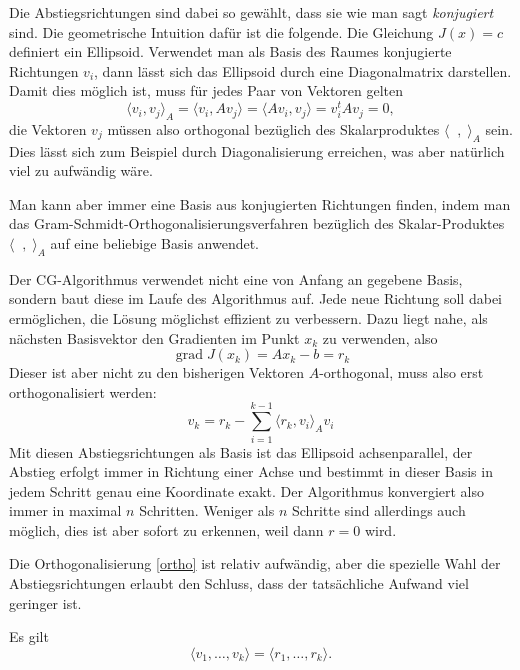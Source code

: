 \documentclass[a4paper,11pt]{article}
\begin{document}
Die Abstiegsrichtungen sind dabei so gewählt, dass sie wie man sagt
{\em konjugiert} sind.
Die geometrische Intuition dafür ist die folgende.
Die Gleichung $J(x)=c$ definiert ein Ellipsoid.
Verwendet man als Basis des Raumes konjugierte Richtungen $v_i$, dann lässt
sich das Ellipsoid durch eine Diagonalmatrix darstellen.
Damit dies möglich ist, muss für jedes Paar von Vektoren gelten
\[
\langle v_i , v_j\rangle_A
=
\langle v_i,Av_j\rangle
=
\langle Av_i,v_j\rangle
=
v_i^t Av_j = 0,
\]
die Vektoren $v_j$ müssen also orthogonal bezüglich des Skalarproduktes
$\langle\;\;,\;\rangle_A$ sein.
Dies lässt sich zum Beispiel durch Diagonalisierung erreichen, was
aber natürlich viel zu aufwändig wäre.

Man kann aber immer eine Basis aus konjugierten Richtungen finden,
indem man das Gram-Schmidt-Orthogonalisierungsverfahren bezüglich
des Skalar-Produktes $\langle\;\;,\;\rangle_A$ auf eine beliebige
Basis anwendet.

Der CG-Algorithmus verwendet nicht eine von Anfang an gegebene Basis,
sondern baut diese im Laufe des Algorithmus auf.
Jede neue Richtung soll dabei ermöglichen, die Lösung möglichst effizient
zu verbessern.
Dazu liegt nahe, als nächsten Basisvektor den Gradienten im Punkt
$x_k$ zu verwenden, also 
\[
\operatorname{grad}J(x_k) = Ax_k-b = r_k
\]
Dieser ist aber nicht zu den bisherigen Vektoren $A$-orthogonal,
muss also erst orthogonalisiert werden:
\begin{equation}
v_{k} = r_k - \sum_{i=1}^{k-1} \langle r_k,v_i\rangle_A v_i
\label{ortho}
\end{equation}
Mit diesen Abstiegsrichtungen als Basis ist das Ellipsoid achsenparallel,
der Abstieg erfolgt immer in Richtung einer Achse und bestimmt in
dieser Basis in jedem Schritt genau eine Koordinate exakt.
Der Algorithmus konvergiert also immer in maximal $n$ Schritten.
Weniger als $n$ Schritte sind allerdings auch möglich, dies ist
aber sofort zu erkennen, weil dann $r=0$ wird.

Die Orthogonalisierung \eqref{ortho} ist relativ aufwändig, aber die
spezielle Wahl der Abstiegsrichtungen erlaubt den Schluss, dass der
tatsächliche Aufwand viel geringer ist.

%
%
\begin{beobachtung}
Es gilt
\begin{equation}
\langle v_1,\dots,v_k\rangle
=
\langle r_1,\dots,r_k\rangle.
\label{reqv}
\end{equation}
\end{beobachtung}
\end{document}

